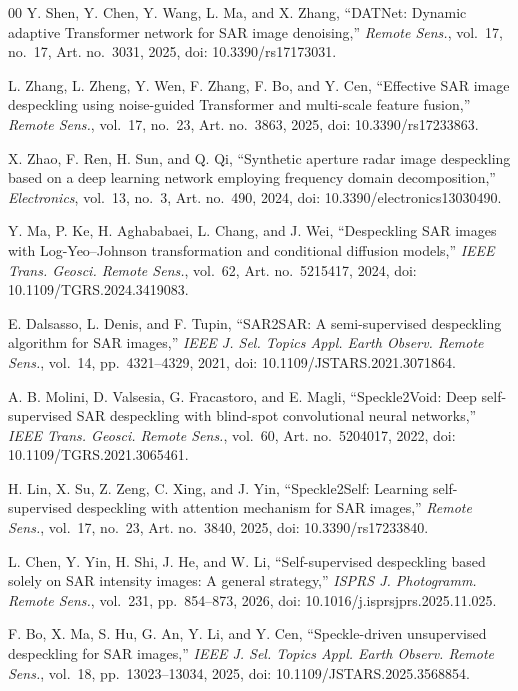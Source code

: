 \documentclass[journal]{IEEEtran}
\begin{document}
\begin{thebibliography}{00}
Y. Shen, Y. Chen, Y. Wang, L. Ma, and X. Zhang, ``DATNet: Dynamic adaptive Transformer network for SAR image denoising,'' \emph{Remote Sens.}, vol.~17, no.~17, Art. no.~3031, 2025, doi: 10.3390/rs17173031.

L. Zhang, L. Zheng, Y. Wen, F. Zhang, F. Bo, and Y. Cen, ``Effective SAR image despeckling using noise-guided Transformer and multi-scale feature fusion,'' \emph{Remote Sens.}, vol.~17, no.~23, Art. no.~3863, 2025, doi: 10.3390/rs17233863.

X. Zhao, F. Ren, H. Sun, and Q. Qi, ``Synthetic aperture radar image despeckling based on a deep learning network employing frequency domain decomposition,'' \emph{Electronics}, vol.~13, no.~3, Art. no.~490, 2024, doi: 10.3390/electronics13030490.

Y. Ma, P. Ke, H. Aghababaei, L. Chang, and J. Wei, ``Despeckling SAR images with Log-Yeo--Johnson transformation and conditional diffusion models,'' \emph{IEEE Trans. Geosci. Remote Sens.}, vol.~62, Art. no.~5215417, 2024, doi: 10.1109/TGRS.2024.3419083.

E. Dalsasso, L. Denis, and F. Tupin, ``SAR2SAR: A semi-supervised despeckling algorithm for SAR images,'' \emph{IEEE J. Sel. Topics Appl. Earth Observ. Remote Sens.}, vol.~14, pp.~4321--4329, 2021, doi: 10.1109/JSTARS.2021.3071864.

A. B. Molini, D. Valsesia, G. Fracastoro, and E. Magli, ``Speckle2Void: Deep self-supervised SAR despeckling with blind-spot convolutional neural networks,'' \emph{IEEE Trans. Geosci. Remote Sens.}, vol.~60, Art. no.~5204017, 2022, doi: 10.1109/TGRS.2021.3065461.

H. Lin, X. Su, Z. Zeng, C. Xing, and J. Yin, ``Speckle2Self: Learning self-supervised despeckling with attention mechanism for SAR images,'' \emph{Remote Sens.}, vol.~17, no.~23, Art. no.~3840, 2025, doi: 10.3390/rs17233840.

L. Chen, Y. Yin, H. Shi, J. He, and W. Li, ``Self-supervised despeckling based solely on SAR intensity images: A general strategy,'' \emph{ISPRS J. Photogramm. Remote Sens.}, vol.~231, pp.~854--873, 2026, doi: 10.1016/j.isprsjprs.2025.11.025.

F. Bo, X. Ma, S. Hu, G. An, Y. Li, and Y. Cen, ``Speckle-driven unsupervised despeckling for SAR images,'' \emph{IEEE J. Sel. Topics Appl. Earth Observ. Remote Sens.}, vol.~18, pp.~13023--13034, 2025, doi: 10.1109/JSTARS.2025.3568854.


\end{thebibliography}
\end{document}
